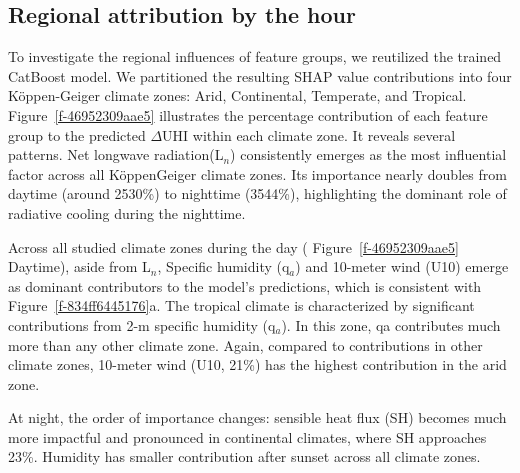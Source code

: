 \subsection*{Regional attribution by the hour}To investigate the regional influences of feature groups, we reutilized the trained CatBoost model. We partitioned the resulting SHAP value contributions into four K{\"{o}}ppen-Geiger climate zones: Arid, Continental, Temperate, and Tropical. Figure~\ref{f-46952309aae5}  illustrates the percentage contribution of each feature group to the predicted \ensuremath{\Delta }UHI within each climate zone.  It reveals several patterns. Net longwave radiation(L\ensuremath{_{n}}) consistently emerges as the most influential factor across all K{\"{o}}ppen{\textendash}Geiger climate zones. Its importance nearly doubles from daytime (around 25{\textendash}30\%) to nighttime (35{\textendash}44\%), highlighting the dominant role of radiative cooling during the nighttime.

Across all studied climate zones during the day ( Figure~\ref{f-46952309aae5} Daytime), aside from L\ensuremath{_{n}}, Specific humidity (q\ensuremath{_{a}}) and 10-meter wind (U10) emerge as dominant contributors to the model's predictions, which is consistent with Figure~\ref{f-834ff6445176}a. The tropical climate is characterized by significant contributions from 2-m specific humidity (q\ensuremath{_{a}}). In this zone, qa contributes much more than any other climate zone. Again, compared to contributions in other climate zones, 10-meter wind (U10, 21\%) has the highest contribution in the arid zone.

At night, the order of importance changes: sensible heat flux (SH) becomes much more impactful and pronounced in continental climates, where SH approaches 23\%. Humidity has smaller contribution after sunset across all climate zones.


